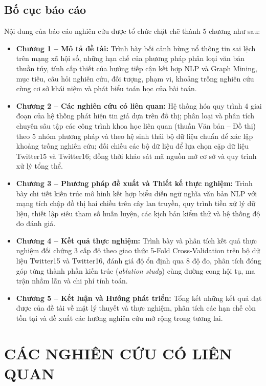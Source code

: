 \documentclass[11pt,a4paper]{extreport}
\begin{document}
\section{Bố cục báo cáo}
Nội dung của báo cáo nghiên cứu được tổ chức chặt chẽ thành 5 chương như sau:
\begin{itemize}
    \item \textbf{Chương 1 -- Mô tả đề tài:} Trình bày bối cảnh bùng nổ thông tin sai lệch trên mạng xã hội số, những hạn chế của phương pháp phân loại văn bản thuần túy, tính cấp thiết của hướng tiếp cận kết hợp NLP và Graph Mining, mục tiêu, câu hỏi nghiên cứu, đối tượng, phạm vi, khoảng trống nghiên cứu cùng cơ sở khái niệm và phát biểu toán học của bài toán.
    \item \textbf{Chương 2 -- Các nghiên cứu có liên quan:} Hệ thống hóa quy trình 4 giai đoạn của hệ thống phát hiện tin giả dựa trên đồ thị; phân loại và phân tích chuyên sâu tập các công trình khoa học liên quan (thuần Văn bản -- Đồ thị) theo 5 nhóm phương pháp và theo hệ sinh thái bộ dữ liệu chuẩn để xác lập khoảng trống nghiên cứu; đối chiếu các bộ dữ liệu để lựa chọn cặp dữ liệu Twitter15 và Twitter16; đồng thời khảo sát mã nguồn mở cơ sở và quy trình xử lý tổng thể.
    \item \textbf{Chương 3 -- Phương pháp đề xuất và Thiết kế thực nghiệm:} Trình bày chi tiết kiến trúc mô hình kết hợp biểu diễn ngữ nghĩa văn bản NLP với mạng tích chập đồ thị hai chiều trên cây lan truyền, quy trình tiền xử lý dữ liệu, thiết lập siêu tham số huấn luyện, các kịch bản kiểm thử và hệ thống độ đo đánh giá.
    \item \textbf{Chương 4 -- Kết quả thực nghiệm:} Trình bày và phân tích kết quả thực nghiệm đối chứng 3 cấp độ theo giao thức 5-Fold Cross-Validation trên bộ dữ liệu Twitter15 và Twitter16, đánh giá độ ổn định qua 8 độ đo, phân tích đóng góp từng thành phần kiến trúc (\textit{ablation study}) cùng đường cong hội tụ, ma trận nhầm lẫn và chi phí tính toán.
    \item \textbf{Chương 5 -- Kết luận và Hướng phát triển:} Tổng kết những kết quả đạt được của đề tài về mặt lý thuyết và thực nghiệm, phân tích các hạn chế còn tồn tại và đề xuất các hướng nghiên cứu mở rộng trong tương lai.
\end{itemize}


\chapter{CÁC NGHIÊN CỨU CÓ LIÊN QUAN}
\end{document}
